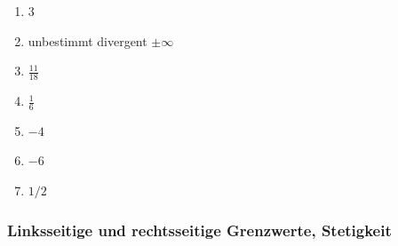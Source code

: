 
\begin{enumerate}
    \item $3$
    \item unbestimmt divergent $\pm\infty$
    \item $\frac{11}{18}$
    \item $\frac{1}{6}$
    \item $-4$
    \item $-6$
    \item $1/2$
\end{enumerate}
















\clearpage

\subsubsection{Linksseitige und rechtsseitige Grenzwerte, Stetigkeit}

